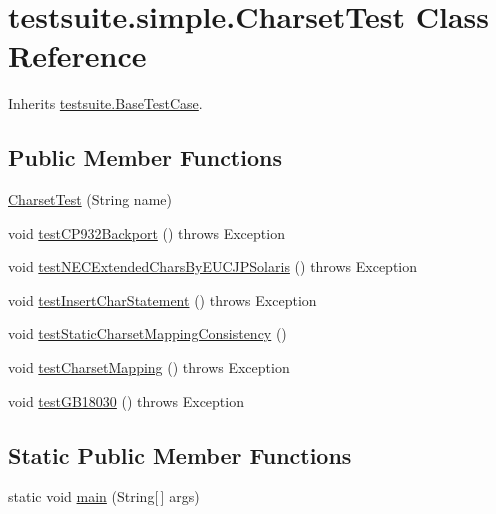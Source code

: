 \hypertarget{classtestsuite_1_1simple_1_1_charset_test}{}\section{testsuite.\+simple.\+Charset\+Test Class Reference}
\label{classtestsuite_1_1simple_1_1_charset_test}


Inherits \mbox{\hyperlink{classtestsuite_1_1_base_test_case}{testsuite.\+Base\+Test\+Case}}.

\subsection*{Public Member Functions}
\begin{DoxyCompactItemize}
\item 
\mbox{\hyperlink{classtestsuite_1_1simple_1_1_charset_test_a6c41126f4f1e57b55d853cf3d7c55155}{Charset\+Test}} (String name)
\item 
void \mbox{\hyperlink{classtestsuite_1_1simple_1_1_charset_test_a7c62b0525cd9efee8029643a749d3c18}{test\+C\+P932\+Backport}} ()  throws Exception 
\item 
void \mbox{\hyperlink{classtestsuite_1_1simple_1_1_charset_test_a628f2a4dec5304244c9b100cc0fd2c4a}{test\+N\+E\+C\+Extended\+Chars\+By\+E\+U\+C\+J\+P\+Solaris}} ()  throws Exception 
\item 
void \mbox{\hyperlink{classtestsuite_1_1simple_1_1_charset_test_abc30bd84bed2b0038ddd200e11c29a76}{test\+Insert\+Char\+Statement}} ()  throws Exception 
\item 
void \mbox{\hyperlink{classtestsuite_1_1simple_1_1_charset_test_a055fafb213fa7c790eff0c58414c9579}{test\+Static\+Charset\+Mapping\+Consistency}} ()
\item 
void \mbox{\hyperlink{classtestsuite_1_1simple_1_1_charset_test_ace6046bed9bc3e29734e98003258fd58}{test\+Charset\+Mapping}} ()  throws Exception 
\item 
void \mbox{\hyperlink{classtestsuite_1_1simple_1_1_charset_test_a6fa2cb7372e754c7a783af4cba1cbd17}{test\+G\+B18030}} ()  throws Exception 
\end{DoxyCompactItemize}
\subsection*{Static Public Member Functions}
\begin{DoxyCompactItemize}
\item 
static void \mbox{\hyperlink{classtestsuite_1_1simple_1_1_charset_test_a3413e56bcb53af4a9f65a650fb408b47}{main}} (String\mbox{[}$\,$\mbox{]} args)
\end{DoxyCompactItemize}
